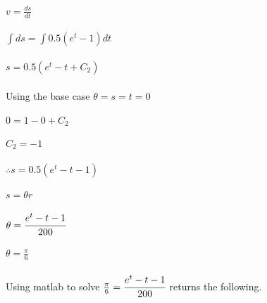 \documentclass{article}
\begin{document}
\subsection{}
$v = \frac{ds}{dt}$\\ \\
$\int ds = \int 0.5(e^t - 1)dt$\\ \\
$s = 0.5(e^t - t + C_2)$\\ \\
Using the base case $\theta = s = t = 0$\\ \\
$0 = 1 - 0 + C_2$\\ \\
$C_2 = -1$\\ \\
$\therefore s = 0.5(e^t - t-1)$\\ \\
$s = \theta r$\\ \\
$\theta = \cfrac{e^t - t - 1}{200}$\\ \\
$\theta = \frac{\pi}{6}$\\ \\
Using matlab to solve $\frac{\pi}{6} = \cfrac{e^t - t - 1}{200}$ returns the following. \\ 
\end{document}
